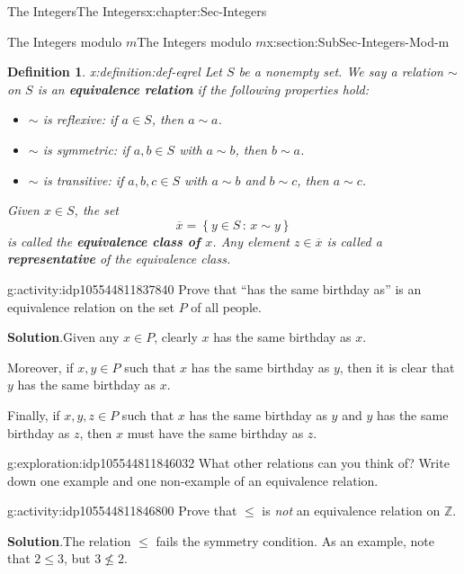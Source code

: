 \documentclass[oneside,10pt,]{book}
\newcommand{\blocktitlefont}{\relax}
\newcommand{\terminology}[1]{\textbf{#1}}
\numberwithin{equation}{section}
\renewcommand{\le}{\leqslant}
\newcommand{\setof}[2]{{\left\{#1\,\colon\,#2\right\}}}
\def\Z{{\mathbb Z}}
\newtheorem{definition}[theorem]{Definition}
\begin{document}
\begin{chapterptx}{The Integers}{}{The Integers}{}{}{x:chapter:Sec-Integers}
\begin{sectionptx}{The Integers modulo \(m\)}{}{The Integers modulo \(m\)}{}{}{x:section:SubSec-Integers-Mod-m}
\begin{definition}{}{x:definition:def-eqrel}
%
Let \(S\) be a nonempty set. We say a relation \(\sim\) on \(S\) is an \terminology{equivalence relation} if the following properties hold:%
\begin{itemize}[label=\textbullet]
\item{}\(\sim\) is \emph{reflexive}: if \(a\in S\), then \(a\sim a\).%
\item{}\(\sim\) is \emph{symmetric}: if \(a,b\in S\) with \(a\sim b\), then \(b\sim a\).%
\item{}\(\sim\) is \emph{transitive}: if \(a,b,c\in S\) with \(a\sim b\) and \(b\sim c\), then \(a\sim c\).%
\end{itemize}
%
\par
Given \(x\in S\), the set%
\begin{equation*}
\overline{x} = \setof{y\in S}{x\sim y}
\end{equation*}
is called the \terminology{equivalence class of \(x\)}. Any element \(z\in \overline{x}\) is called a \terminology{representative} of the equivalence class.%
\end{definition}
\begin{activity}{}{g:activity:idp105544811837840}%
Prove that ``has the same birthday as'' is an equivalence relation on the set \(P\) of all people.%
\par\smallskip%
\noindent\textbf{\blocktitlefont Solution}.\hypertarget{g:solution:idp105544811839376}{}\quad{}Given any \(x\in P\), clearly \(x\) has the same birthday as \(x\).%
\par
Moreover, if \(x,y\in P\) such that \(x\) has the same birthday as \(y\), then it is clear that \(y\) has the same birthday as \(x\).%
\par
Finally, if \(x,y,z\in P\) such that \(x\) has the same birthday as \(y\) and \(y\) has the same birthday as \(z\), then \(x\) must have the same birthday as \(z\).%
\end{activity}%
\begin{exploration}{}{g:exploration:idp105544811846032}%
What other relations can you think of? Write down one example and one non-example of an equivalence relation.%
\end{exploration}%
\begin{activity}{}{g:activity:idp105544811846800}%
Prove that \(\le\) is \emph{not} an equivalence relation on \(\Z\).%
\par\smallskip%
\noindent\textbf{\blocktitlefont Solution}.\hypertarget{g:solution:idp105544811848720}{}\quad{}The relation \(\le\) fails the symmetry condition. As an example, note that \(2 \le 3\), but \(3\not\le 2\).%

\end{activity}
\end{sectionptx}
\end{chapterptx}
\end{document}
